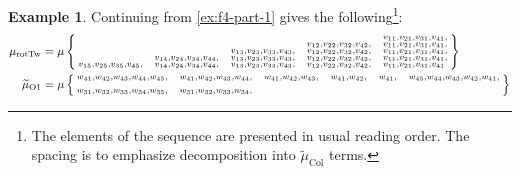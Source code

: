 \documentclass{amsart}
\theoremstyle{plain}
\theoremstyle{definition}
\newtheorem{example}[theorem]{Example}
\theoremstyle{remark}
\newcommand{\murottwist}{{\mu_{\text{rotTw}}}}
\newcommand{\muint}[1]{\widetilde{\mu}_{\text{#1}}}
\newcommand{\mucol}{\muint{Col}}
\begin{document}
  \begin{example}
    \label{ex:f4-part-2}
    Continuing from \cref{ex:f4-part-1} gives the following\footnote{The
      elements of the sequence are presented in usual reading order. The
      spacing is to emphasize decomposition into $\mucol$ terms.}:
    \begin{align*}
      \murottwist &= \mu\Set{
        \begin{subarray}{l}
\phantom{
         v_{1 5}, v_{2 5}, v_{3 5}, v_{4 5}, \quad
         v_{1 4}, v_{2 4}, v_{3 4}, v_{4 4}, \quad
         v_{1 3}, v_{2 3}, v_{3 3}, v_{4 3}, \quad
         v_{1 2}, v_{2 2}, v_{3 2}, v_{4 2}, \quad
}
         v_{1 1}, v_{2 1}, v_{3 1}, v_{4 1}, \\
\phantom{
         v_{1 5}, v_{2 5}, v_{3 5}, v_{4 5}, \quad
         v_{1 4}, v_{2 4}, v_{3 4}, v_{4 4}, \quad
         v_{1 3}, v_{2 3}, v_{3 3}, v_{4 3}, \quad
}
         v_{1 2}, v_{2 2}, v_{3 2}, v_{4 2}, \quad
         v_{1 1}, v_{2 1}, v_{3 1}, v_{4 1}, \\
\phantom{
         v_{1 5}, v_{2 5}, v_{3 5}, v_{4 5}, \quad
         v_{1 4}, v_{2 4}, v_{3 4}, v_{4 4}, \quad
}
         v_{1 3}, v_{2 3}, v_{3 3}, v_{4 3}, \quad
         v_{1 2}, v_{2 2}, v_{3 2}, v_{4 2}, \quad
         v_{1 1}, v_{2 1}, v_{3 1}, v_{4 1}, \\
\phantom{
         v_{1 5}, v_{2 5}, v_{3 5}, v_{4 5}, \quad
}
         v_{1 4}, v_{2 4}, v_{3 4}, v_{4 4}, \quad
         v_{1 3}, v_{2 3}, v_{3 3}, v_{4 3}, \quad
         v_{1 2}, v_{2 2}, v_{3 2}, v_{4 2}, \quad
         v_{1 1}, v_{2 1}, v_{3 1}, v_{4 1}, \\
\phantom{
}
         v_{1 5}, v_{2 5}, v_{3 5}, v_{4 5}, \quad
         v_{1 4}, v_{2 4}, v_{3 4}, v_{4 4}, \quad
         v_{1 3}, v_{2 3}, v_{3 3}, v_{4 3}, \quad
         v_{1 2}, v_{2 2}, v_{3 2}, v_{4 2}, \quad
         v_{1 1}, v_{2 1}, v_{3 1}, v_{4 1} \\
        \end{subarray}
      } \\
      \muint{O1} &= \mu\Set{
        \begin{subarray}{l}
w_{41}, w_{42}, w_{43}, w_{44}, w_{45}, \quad
w_{41}, w_{42}, w_{43}, w_{44}, \quad
w_{41}, w_{42}, w_{43}, \quad
w_{41}, w_{42}, \quad
w_{41}, \quad
w_{45}, w_{44}, w_{43}, w_{42}, w_{41}, \\
\\
w_{31}, w_{32}, w_{33}, w_{34}, w_{35}, \quad
w_{31}, w_{32}, w_{33}, w_{34}, \quad

\end{subarray}}
\end{align*}
\end{example}
\end{document}
